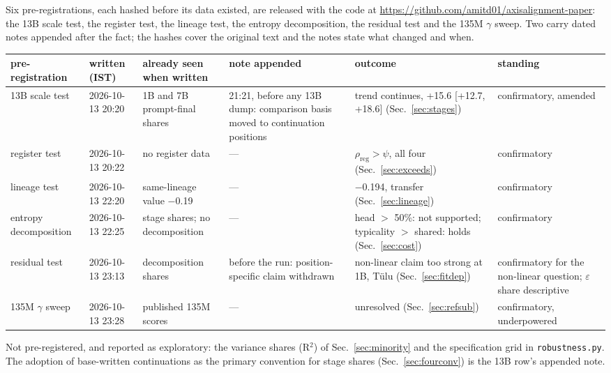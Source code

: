 \documentclass[11pt]{article}
\begin{document}
Six pre-registrations, each hashed before its data existed, are released with the code
at \url{https://github.com/amitd01/axisalignment-paper}: the 13B scale test, the register test, the lineage test, the entropy
decomposition, the residual test and the 135M $\gamma$ sweep. Two carry dated notes
appended after the fact; the hashes cover the original text and the notes state what
changed and when.

\begin{center}
\scriptsize
\begin{tabular}{p{} p{} p{} p{} p{} p{}}
\toprule
pre-registration & written (IST) & already seen when written & note appended & outcome & standing \\
\midrule
13B scale test & 2026-10-13 20:20 & 1B and 7B prompt-final shares & 21:21, before any 13B dump: comparison basis moved to continuation positions & trend continues, +15.6 [+12.7, +18.6] (Sec.~\ref{sec:stages}) & confirmatory, amended \\
register test & 2026-10-13 20:22 & no register data & --- & $\rho_{\mathrm{reg}} > \psi$, all four (Sec.~\ref{sec:exceeds}) & confirmatory \\
lineage test & 2026-10-13 22:20 & same-lineage value $-$0.19 & --- & $-$0.194, transfer (Sec.~\ref{sec:lineage}) & confirmatory \\
entropy decomposition & 2026-10-13 22:25 & stage shares; no decomposition & --- & head $>$ 50\%: not supported; typicality $>$ shared: holds (Sec.~\ref{sec:cost}) & confirmatory \\
residual test & 2026-10-13 23:13 & decomposition shares & before the run: position-specific claim withdrawn & non-linear claim too strong at 1B, T\"ulu (Sec.~\ref{sec:fitdep}) & confirmatory for the non-linear question; $\varepsilon$ share descriptive \\
135M $\gamma$ sweep & 2026-10-13 23:28 & published 135M scores & --- & unresolved (Sec.~\ref{sec:refsub}) & confirmatory, underpowered \\
\bottomrule
\end{tabular}
\end{center}

Not pre-registered, and reported as exploratory: the variance shares (R$^2$) of
Sec.~\ref{sec:minority} and the specification grid in \texttt{robustness.py}. The adoption of
base-written continuations as the primary convention for stage shares (Sec.~\ref{sec:fourconv}) is
the 13B row's appended note.
\end{document}
